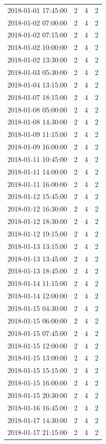\begin{tabular}{lrrr}
2018-01-01 17:45:00 & 2 & 4 & 2 \\
2018-01-02 07:00:00 & 2 & 4 & 2 \\
2018-01-02 07:15:00 & 2 & 4 & 2 \\
2018-01-02 10:00:00 & 2 & 4 & 2 \\
2018-01-02 13:30:00 & 2 & 4 & 2 \\
2018-01-03 05:30:00 & 2 & 4 & 2 \\
2018-01-04 13:15:00 & 2 & 4 & 2 \\
2018-01-07 18:15:00 & 2 & 4 & 2 \\
2018-01-08 05:00:00 & 2 & 4 & 2 \\
2018-01-08 14:30:00 & 2 & 4 & 2 \\
2018-01-09 11:15:00 & 2 & 4 & 2 \\
2018-01-09 16:00:00 & 2 & 4 & 2 \\
2018-01-11 10:45:00 & 2 & 4 & 2 \\
2018-01-11 14:00:00 & 2 & 4 & 2 \\
2018-01-11 16:00:00 & 2 & 4 & 2 \\
2018-01-12 15:45:00 & 2 & 4 & 2 \\
2018-01-12 16:30:00 & 2 & 4 & 2 \\
2018-01-12 18:30:00 & 2 & 4 & 2 \\
2018-01-12 19:15:00 & 2 & 4 & 2 \\
2018-01-13 13:15:00 & 2 & 4 & 2 \\
2018-01-13 13:45:00 & 2 & 4 & 2 \\
2018-01-13 18:45:00 & 2 & 4 & 2 \\
2018-01-14 11:15:00 & 2 & 4 & 2 \\
2018-01-14 12:00:00 & 2 & 4 & 2 \\
2018-01-15 04:30:00 & 2 & 4 & 2 \\
2018-01-15 06:00:00 & 2 & 4 & 2 \\
2018-01-15 07:45:00 & 2 & 4 & 2 \\
2018-01-15 12:00:00 & 2 & 4 & 2 \\
2018-01-15 13:00:00 & 2 & 4 & 2 \\
2018-01-15 15:15:00 & 2 & 4 & 2 \\
2018-01-15 16:00:00 & 2 & 4 & 2 \\
2018-01-15 20:30:00 & 2 & 4 & 2 \\
2018-01-16 16:45:00 & 2 & 4 & 2 \\
2018-01-17 14:30:00 & 2 & 4 & 2 \\
2018-01-17 21:15:00 & 2 & 4 & 2 \\

\end{tabular}
